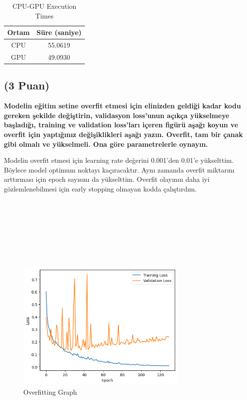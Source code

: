 \documentclass[11pt]{article}
\begin{document}
\begin{table}[ht!]
    \centering
    \caption{CPU-GPU Execution Times}
    \begin{tabular}{c|c}
        Ortam & Süre (saniye) \\\hline
        CPU & 55.0619 \\
        GPU & 49.0930\\
    \end{tabular}
    \label{tab:my_table}
\end{table}

\subsection{(3 Puan)} \textbf{Modelin eğitim setine overfit etmesi için elinizden geldiği kadar kodu gereken şekilde değiştirin, validasyon loss'unun açıkça yükselmeye başladığı, training ve validation loss'ları içeren figürü aşağı koyun ve overfit için yaptığınız değişiklikleri aşağı yazın. Overfit, tam bir çanak gibi olmalı ve yükselmeli. Ona göre parametrelerle oynayın.}

Modelin overfit etmesi için learning rate değerini 0.001'den 0.01'e yükselttim. Böylece model optimum noktayı kaçıracaktır. Aynı zamanda overfit miktarını arttırması için epoch sayısını da yükselttim. Overfit olayının daha iyi gözlemlenebilmesi için early stopping olmayan kodda çalıştırdım.
\\
\\
\\
\\
\\
\\
\\
\\

\begin{figure}[ht!]
    \centering
    \includegraphics[width=0.75\textwidth]{overfitting.png}
    \caption{Overfitting Graph}
    \label{fig:my_pic}
\end{figure}
\end{document}
